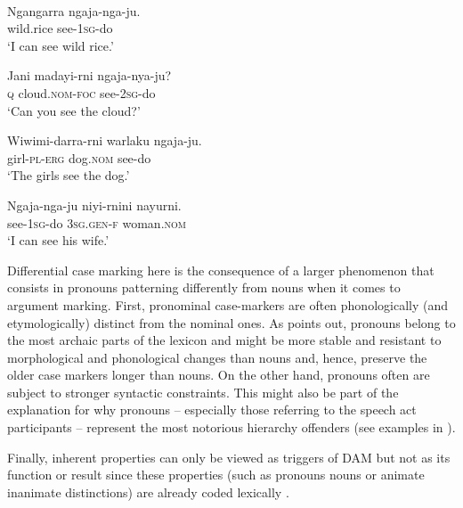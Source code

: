 \documentclass[output=paper]{LSP/langsci}
\begin{document}
\ea\label{01-wi-ex:6:Jingulu}
\\
\begin{xlist}

\ex\label{01-wi-ex:6a:Jingulu}
	\gll	Ngangarra	ngaja-nga-ju.\\
	wild.rice	see-\textsc{1sg}-do\\
	\glt	‘I can see wild rice.’%

\ex\label{01-wi-ex:6b:Jingulu}
	\gll	Jani	madayi-rni		ngaja-nya-ju?\\
	\textsc{q}	cloud.\textsc{nom}-\textsc{foc}	see-\textsc{2sg}-do\\
	\glt	‘Can you see the cloud?’ %
	
\ex\label{01-wi-ex:6c:Jingulu}
	\gll	Wiwimi-darra-rni	warlaku	ngaja-ju.\\
	girl-\textsc{pl}-\textsc{erg}		dog.\textsc{nom} 	see-do\\
	\glt	‘The girls see the dog.’ %
	
\ex\label{01-wi-ex:6d:Jingulu}
	\gll	Ngaja-nga-ju	niyi-rnini	nayurni.\\
	see-\textsc{1sg}-do	\textsc{3sg.gen}-\textsc{f}	woman.\textsc{nom}\\
	\glt	‘I can see his wife.’ %
	
\end{xlist}
\z

\noindent Differential case marking here is the consequence of a larger phenomenon that consists in pronouns patterning differently from nouns when it comes to argument marking. 
First, pronominal case-markers are often phonologically (and etymologically) distinct from the nominal ones. 
As \citet{Filimonova2005Noun} points out, pronouns belong to the most archaic parts of the lexicon and might be more stable and resistant to morphological and phonological changes than nouns and, hence, preserve the older case markers longer than nouns. 
On the other hand, pronouns often are subject to stronger syntactic constraints. 
This might also be part of the explanation for why pronouns – especially those referring to the speech act participants – represent the most notorious hierarchy offenders (see examples in \citealt{Bickeletal2015Typological}).

Finally, inherent properties can only be viewed as triggers of DAM but not as its function or result since these properties (such as pronouns \vs nouns or animate \vs inanimate distinctions) are already coded lexically \citep[4--5]{Kleinetal2011Case}.
\end{document}
